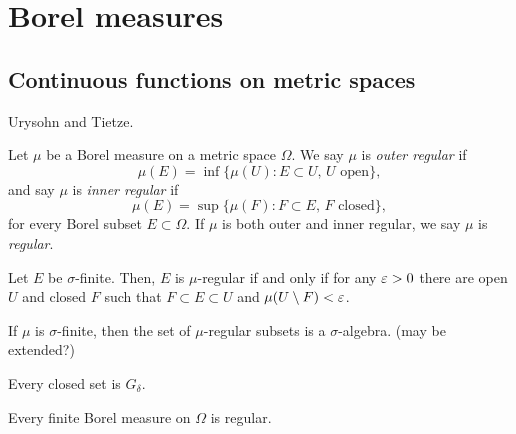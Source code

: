 \documentclass{../../large}
\begin{document}
\chapter{Borel measures}



\section{Continuous functions on metric spaces}

Urysohn and Tietze.


\begin{prb}
Let $\mu$ be a Borel measure on a metric space $\Omega$.
We say $\mu$ is \emph{outer regular} if
\[\mu(E)=\inf\{\mu(U):E\subset U,\,U\text{ open}\},\]
and say $\mu$ is \emph{inner regular} if
\[\mu(E)=\sup\{\mu(F):F\subset E,\,F\text{ closed}\},\]
for every Borel subset $E\subset\Omega$.
If $\mu$ is both outer and inner regular, we say $\mu$ is \emph{regular}.
\begin{parts}
\item Let $E$ be $\sigma$-finite. Then, $E$ is $\mu$-regular if and only if for any $\varepsilon>0$ there are open $U$ and closed $F$ such that $F\subset E\subset U$ and $\mu(U\setminus F)<\varepsilon$.
\item If $\mu$ is $\sigma$-finite, then the set of $\mu$-regular subsets is a $\sigma$-algebra. (may be extended?)
\item Every closed set is $G_\delta$.
\item Every finite Borel measure on $\Omega$ is regular.
\end{parts}
\end{prb}
\begin{pf}
\end{pf}
\end{document}
